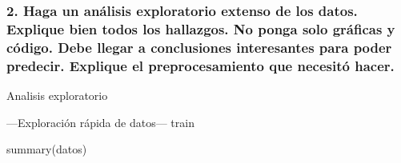 \documentclass[
]{article}
\newenvironment{Shaded}{\begin{snugshade}}{\end{snugshade}}
\newcommand{\FunctionTok}[1]{\textcolor[rgb]{0.00,0.00,0.00}{#1}}
\newcommand{\NormalTok}[1]{#1}
\begin{document}
\hypertarget{haga-un-anuxe1lisis-exploratorio-extenso-de-los-datos.-explique-bien-todos-los-hallazgos.-no-ponga-solo-gruxe1ficas-y-cuxf3digo.-debe-llegar-a-conclusiones-interesantes-para-poder-predecir.-explique-el-preprocesamiento-que-necesituxf3-hacer.}{%
\subsubsection{2. Haga un análisis exploratorio extenso de los datos.
Explique bien todos los hallazgos. No ponga solo gráficas y código. Debe
llegar a conclusiones interesantes para poder predecir. Explique el
preprocesamiento que necesitó
hacer.}\label{haga-un-anuxe1lisis-exploratorio-extenso-de-los-datos.-explique-bien-todos-los-hallazgos.-no-ponga-solo-gruxe1ficas-y-cuxf3digo.-debe-llegar-a-conclusiones-interesantes-para-poder-predecir.-explique-el-preprocesamiento-que-necesituxf3-hacer.}}

Analisis exploratorio

---Exploración rápida de datos--- train

\begin{Shaded}
\begin{Highlighting}[]
\FunctionTok{summary}\NormalTok{(datos)}
\end{Highlighting}
\end{Shaded}
\end{document}
